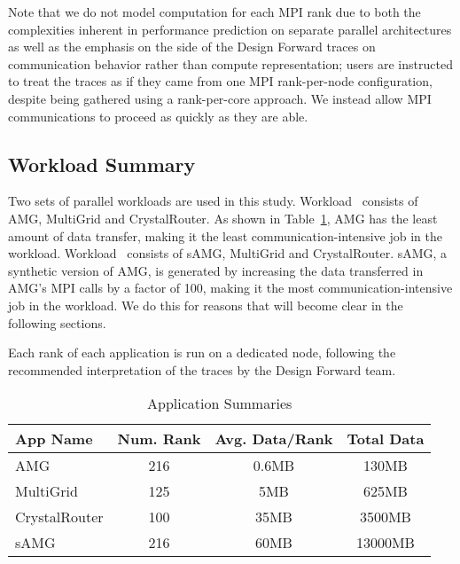Note that we do not model computation for each MPI rank due to both the complexities inherent in performance prediction on separate parallel architectures as well as the emphasis on the side of the Design Forward traces on communication behavior rather than compute representation; users are instructed to treat the traces as if they came from one MPI rank-per-node configuration, despite being gathered using a rank-per-core approach. We instead allow MPI communications to proceed as quickly as they are able. 

\subsection{Workload Summary}
\label{sec:workload summary}

Two sets of parallel workloads are used in this study. Workload~ consists of AMG, MultiGrid and CrystalRouter. As shown in Table~\ref{tab:apps-detail}, AMG has the least amount of data transfer, making it the least communication-intensive job in the workload. Workload~ consists of sAMG, MultiGrid and CrystalRouter. sAMG, a synthetic version of AMG, is generated by increasing the data transferred in AMG's MPI calls by a factor of 100, making it the most communication-intensive job in the workload. We do this for reasons that will become clear in the following sections.

Each rank of each application is run on a dedicated node, following the recommended interpretation of the traces by the Design Forward team.


\begin{table}[ht]
\begin{center}
\caption{Application Summaries}
\label{tab:apps-detail}
\begin{tabular}{l c c c }
\toprule %
\toprule
App Name & Num. Rank & Avg. Data/Rank & Total Data\\ %
\midrule %
AMG  &    216 &   0.6MB   &     130MB\\ %
\midrule
MultiGrid  &    125 &   5MB   &     625MB\\ 
\midrule
CrystalRouter  &   100  &  35MB    &     3500MB\\ 
\midrule
sAMG  &    216 &   60MB   &     13000MB\\ %
\midrule %
\bottomrule %
\end{tabular}
\end{center}
\end{table}

